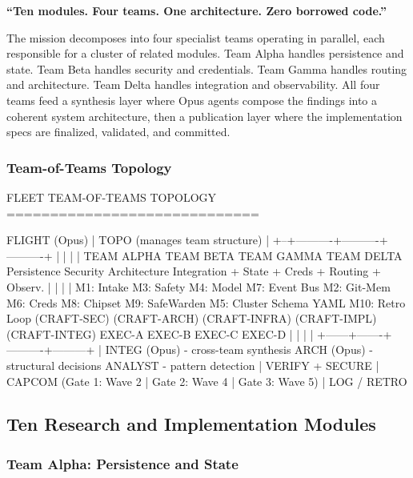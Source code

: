 \documentclass[11pt,letterpaper]{article}
\begin{document}
\textbf{``Ten modules. Four teams. One architecture. Zero borrowed code.''}

The mission decomposes into four specialist teams operating in parallel, each responsible for a cluster of related modules. Team Alpha handles persistence and state. Team Beta handles security and credentials. Team Gamma handles routing and architecture. Team Delta handles integration and observability. All four teams feed a synthesis layer where Opus agents compose the findings into a coherent system architecture, then a publication layer where the implementation specs are finalized, validated, and committed.

\subsubsection{Team-of-Teams Topology}
\begin{asciibox}
FLEET TEAM-OF-TEAMS TOPOLOGY
=============================

  FLIGHT (Opus)
     |
  TOPO (manages team structure)
     |
  +--+----------+----------+----------+
  |             |          |          |
TEAM ALPHA    TEAM BETA  TEAM GAMMA  TEAM DELTA
Persistence   Security   Architecture Integration
+ State       + Creds    + Routing   + Observ.
  |             |          |          |
  M1: Intake   M3: Safety  M4: Model  M7: Event Bus
  M2: Git-Mem  M6: Creds   M8: Chipset M9: SafeWarden
  M5: Cluster  Schema      YAML       M10: Retro Loop
              (CRAFT-SEC) (CRAFT-ARCH)
  (CRAFT-INFRA)           (CRAFT-IMPL)  (CRAFT-INTEG)
  EXEC-A       EXEC-B     EXEC-C       EXEC-D
     |             |          |          |
     +------+-------+----------+---------+
            |
         INTEG (Opus) - cross-team synthesis
         ARCH (Opus)  - structural decisions
         ANALYST      - pattern detection
            |
         VERIFY + SECURE
            |
         CAPCOM (Gate 1: Wave 2 | Gate 2: Wave 4 | Gate 3: Wave 5)
            |
         LOG / RETRO
\end{asciibox}

\subsection{Ten Research and Implementation Modules}

\subsubsection{Team Alpha: Persistence and State}
\end{document}
